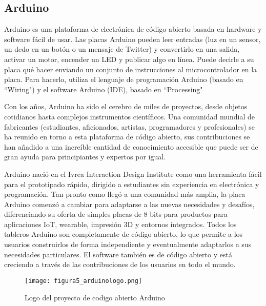 \subsection{Arduino}
	\par
		Arduino es una plataforma de electrónica de código abierto basada en hardware y software fácil de usar. Las placas Arduino pueden leer entradas (luz en un sensor, un dedo en un botón o un mensaje de Twitter) y convertirlo en una salida, activar un motor, encender un LED y publicar algo en línea. Puede decirle a su placa qué hacer enviando un conjunto de instrucciones al microcontrolador en la placa. Para hacerlo, utiliza el lenguaje de programación Arduino (basado en ``Wiring") y el software Arduino (IDE), basado en ``Processing"
	\par \noindent
		Con los años, Arduino ha sido el cerebro de miles de proyectos, desde objetos cotidianos hasta complejos instrumentos científicos. Una comunidad mundial de fabricantes (estudiantes, aficionados, artistas, programadores y profesionales) se ha reunido en torno a esta plataforma de código abierto, sus contribuciones se han añadido a una increíble cantidad de conocimiento accesible que puede ser de gran ayuda para principiantes y expertos por igual.
	\par \noindent
		Arduino nació en el Ivrea Interaction Design Institute como una herramienta fácil para el prototipado rápido, dirigido a estudiantes sin experiencia en electrónica y programación. Tan pronto como llegó a una comunidad más amplia, la placa Arduino comenzó a cambiar para adaptarse a las nuevas necesidades y desafíos, diferenciando su oferta de simples placas de 8 bits para productos para aplicaciones IoT, wearable, impresión 3D y entornos integrados. Todos los tableros Arduino son completamente de código abierto, lo que permite a los usuarios construirlos de forma independiente y eventualmente adaptarlos a sus necesidades particulares. El software también es de código abierto y está creciendo a través de las contribuciones de los usuarios en todo el mundo.
	\begin{figure}[h]
		\centering
		\texttt{[image: figura5\_arduinologo.png]}
		\caption{Logo del proyecto de codigo abierto Arduino}
	\end{figure}

\newpage
\thispagestyle{plain}



